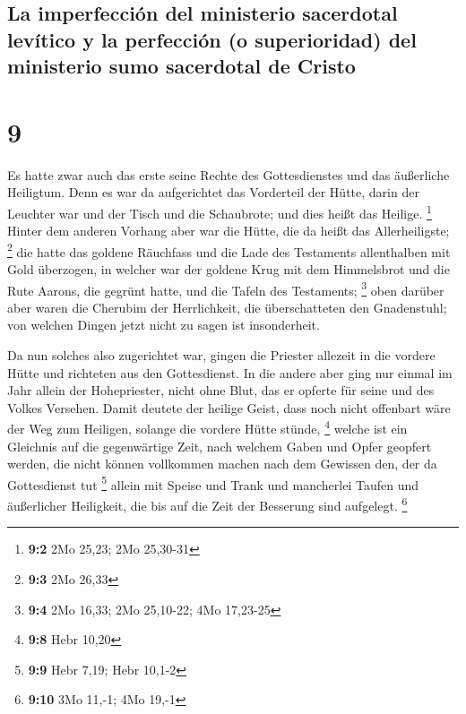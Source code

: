 \hypertarget{la-imperfecciuxf3n-del-ministerio-sacerdotal-levuxedtico-y-la-perfecciuxf3n-o-superioridad-del-ministerio-sumo-sacerdotal-de-cristo}{%
\subsection{La imperfección del ministerio sacerdotal levítico y la
perfección (o superioridad) del ministerio sumo sacerdotal de
Cristo}\label{la-imperfecciuxf3n-del-ministerio-sacerdotal-levuxedtico-y-la-perfecciuxf3n-o-superioridad-del-ministerio-sumo-sacerdotal-de-cristo}}

\hypertarget{section-8}{%
\section{9}\label{section-8}}

 Es hatte zwar auch das erste seine Rechte des
Gottesdienstes und das äußerliche Heiligtum.  Denn es war
da aufgerichtet das Vorderteil der Hütte, darin der Leuchter war und der
Tisch und die Schaubrote; und dies heißt das Heilige. \footnote{\textbf{9:2}
  2Mo 25,23; 2Mo 25,30-31}  Hinter dem anderen Vorhang
aber war die Hütte, die da heißt das Allerheiligste; \footnote{\textbf{9:3}
  2Mo 26,33}  die hatte das goldene Räuchfass und die Lade
des Testaments allenthalben mit Gold überzogen, in welcher war der
goldene Krug mit dem Himmelsbrot und die Rute Aarons, die gegrünt hatte,
und die Tafeln des Testaments; \footnote{\textbf{9:4} 2Mo 16,33; 2Mo
  25,10-22; 4Mo 17,23-25}  oben darüber aber waren die
Cherubim der Herrlichkeit, die überschatteten den Gnadenstuhl; von
welchen Dingen jetzt nicht zu sagen ist insonderheit.

 Da nun solches also zugerichtet war, gingen die Priester
allezeit in die vordere Hütte und richteten aus den Gottesdienst.
 In die andere aber ging nur einmal im Jahr allein der
Hohepriester, nicht ohne Blut, das er opferte für seine und des Volkes
Versehen.  Damit deutete der heilige Geist, dass noch
nicht offenbart wäre der Weg zum Heiligen, solange die vordere Hütte
stünde, \footnote{\textbf{9:8} Hebr 10,20}  welche ist ein
Gleichnis auf die gegenwärtige Zeit, nach welchem Gaben und Opfer
geopfert werden, die nicht können vollkommen machen nach dem Gewissen
den, der da Gottesdienst tut \footnote{\textbf{9:9} Hebr 7,19; Hebr
  10,1-2}  allein mit Speise und Trank und mancherlei
Taufen und äußerlicher Heiligkeit, die bis auf die Zeit der Besserung
sind aufgelegt. \footnote{\textbf{9:10} 3Mo 11,-1; 4Mo 19,-1}

